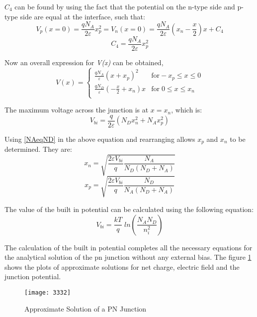 \begin{doublespace}
 $C_4$ can be found by using the fact that the potential on the n-type side and p-type side are equal at the interface, such that:
\begin{equation}
V_{p}(x=0)=\frac{qN_{A}}{2\varepsilon}x_{p}^2=V_{n}(x=0)=\frac{qN_{A}}{2\varepsilon}(x_{n}-\frac{x}{2})x+C_{4}
\end{equation}
\begin{equation}
C_{4}=\frac{qN_{A}}{2\varepsilon}x_{p}^2
\end{equation}

Now an overall expression for \textit{V(x)} can be obtained,
\begin{equation}
V(x) = \begin{cases}
       \frac{qN_{A}}{\varepsilon}(x+x_{p})^2 & \text{for}  -x_{p}\leq x \leq 0 \\
       \frac{qN_{D}}{\varepsilon}(-\frac{x}{2}+x_{n})x  &  \text{for} \; 0 \leq x \leq x_{n}  \\
     \end{cases}
\end{equation}

The maximum voltage across the junction is at  $x= x_{n}$, which is:
\begin{equation}
V_{bi}=\frac{q}{2\varepsilon}(N_{D}x_{n}^2+N_{A}x_{p}^2)
\end{equation}

Using \eqref{NAeqND} in the above equation and rearranging allows $x_{p}$ and $x_{n}$ to be determined. They are:
\begin{equation}
x_{n}=\sqrt{\frac{2\varepsilon V_{bi}}{q}\frac{N_{A}}{N_{D}(N_{D}+N_{A})}}
\end{equation}
\begin{equation}
x_{p}=\sqrt{\frac{2\varepsilon V_{bi}}{q}\frac{N_{D}}{N_{A}(N_{D}+N_{A})}}
\end{equation}

The value of the built in potential can be calculated using the following equation\cite{2000semiconductor}:
\begin{equation}
V_{bi}=\frac{kT}{q} \; ln(\frac{N_{A}N_{D}}{n_i^2})
\end{equation}

The calculation of the built in potential completes all the necessary equations for the analytical solution of the pn junction without any external bias. The figure \ref{pnplt} shows the plots of approximate solutions for net charge, electric field and the junction potential.

\begin{figure}
\centering
\texttt{[image: 3332]}
\caption{Approximate Solution of a PN Junction} 
\label{pnplt}
\end{figure}

\end{doublespace}

